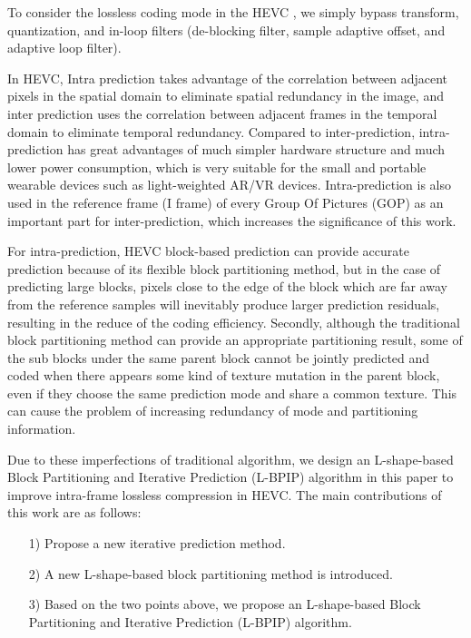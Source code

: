 \documentclass[journal]{IEEEtran}
\begin{document}
To consider the lossless coding mode in the HEVC \cite{06}, we simply bypass transform, quantization, and in-loop filters (de-blocking filter, sample adaptive offset, and adaptive loop filter)\cite{07}. 

In HEVC, Intra prediction takes advantage of the correlation between adjacent pixels in the spatial domain to eliminate spatial redundancy in the image, and inter prediction uses the correlation between adjacent frames in the temporal domain to eliminate temporal redundancy. Compared to inter-prediction, intra-prediction has great advantages of much simpler hardware structure and much lower power consumption, which is very suitable for  the  small and portable wearable devices such as light-weighted AR/VR devices. Intra-prediction is also used in the reference frame (I frame) of every Group Of Pictures (GOP) as an important part for inter-prediction, which increases the significance of this work.

For intra-prediction, HEVC block-based prediction can provide accurate prediction because of its flexible block partitioning method, but in the case of predicting large blocks, pixels close to the edge of the block which are far away from the reference samples will inevitably produce larger prediction residuals, resulting in the reduce of the coding efficiency. Secondly, although the traditional block partitioning method can provide an appropriate partitioning result, some of the sub blocks under the same parent block cannot be jointly predicted and coded when there appears some kind of texture mutation in the parent block, even if they choose the same prediction mode and share a common texture. This can cause the problem of increasing redundancy of mode and partitioning information.

Due to these imperfections of traditional algorithm, we design an L-shape-based Block Partitioning and Iterative Prediction (L-BPIP) algorithm in this paper to improve intra-frame lossless compression in HEVC. The main contributions of this work are as follows:

\begin{itemize}
\item [1)]
Propose a new iterative prediction method.
\item [2)]
A new L-shape-based block partitioning method is introduced.
\item [3)]
Based on the two points above, we propose an L-shape-based Block Partitioning and Iterative Prediction (L-BPIP) algorithm.
\end{itemize}
\end{document}
